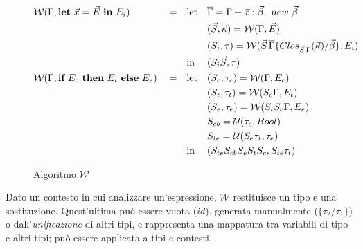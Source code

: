 \begin{figure}
\[\begin{aligned}
\begin{aligned}[t]
            \end{aligned}
            \\
            \algWline{\Gamma}{\textbf{let}\ \vec{x} = \vec{E}\ \textbf{in}\ E_i}
            \begin{aligned}[t]
                 & \text{let} &  & \overline{\Gamma} = \Gamma + \vec{x} : \vec{\beta},\ new\ \vec{\beta}                                                  \\
                 &            &  & (\vec{S}, \vec{\kappa}) = \algW{\overline{\Gamma}}{\vec{E}}                                                            \\
                 &            &  & (S_i, \tau) = \algW{\vec{S}\,\overline{\Gamma} \{Clos_{\vec{S}\,\overline{\Gamma}}(\vec{\kappa}) / \vec{\beta}\}}{E_i} \\
                 & \text{in}  &  & (S_i \vec{S}, \tau)
            \end{aligned}
            \\
            \algWline{\Gamma}{\textbf{if}\ E_c\ \textbf{then}\ E_t\ \textbf{else}\ E_e}
            \begin{aligned}[t]
                 & \text{let} &  & (S_c, \tau_c) = \algW{\Gamma}{E_c}         \\
                 &            &  & (S_t, \tau_t) = \algW{S_c \Gamma}{E_t}     \\
                 &            &  & (S_e, \tau_e) = \algW{S_t S_c \Gamma}{E_e} \\
                 &            &  & S_{cb} = \mathcal{U}(\tau_c, Bool)         \\
                 &            &  & S_{te} = \mathcal{U}(S_e \tau_t, \tau_e)   \\
                 & \text{in}  &  & (S_{te} S_{cb} S_e S_t S_c, S_{te} \tau_t)
            \end{aligned}
        \end{aligned}
    \]
    \caption{Algoritmo $\mathcal{W}$}
    \label{fig:3-4-algorithm-w}
    \vspace{4mm}
\end{figure}

\noindent Dato un contesto in cui analizzare un'espressione, $\mathcal{W}$ restituisce un tipo e una sostituzione.
Quest'ultima può essere vuota ($id$), generata manualmente ($\{\tau_2 / \tau_1\}$) o dall'\textit{unificazione} di altri tipi,
e rappresenta una mappatura tra variabili di tipo e altri tipi; può essere applicata a tipi e contesti.

